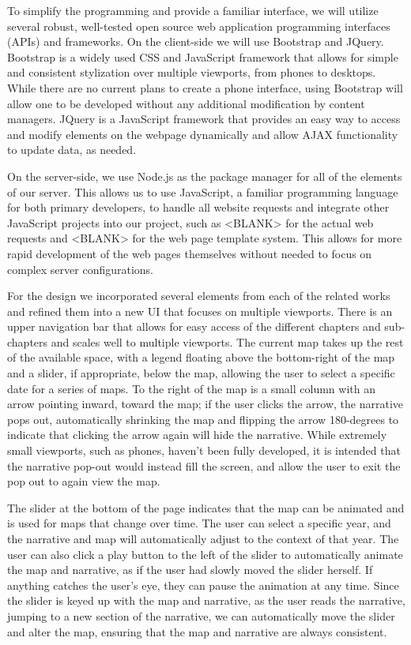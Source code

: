 \documentclass[11pt, draftcls, conference, onecolumn]{IEEEtran}
\begin{document}
To simplify the programming and provide a familiar interface, we will utilize several robust, well-tested open source web application programming interfaces (APIs) and frameworks. On the client-side we will use Bootstrap and JQuery. Bootstrap is a widely used CSS and JavaScript framework that allows for simple and consistent stylization over multiple viewports, from phones to desktops. While there are no current plans to create a phone interface, using Bootstrap will allow one to be developed without any additional modification by content managers. JQuery is a JavaScript framework that provides an easy way to access and modify elements on the webpage dynamically and allow AJAX functionality to update data, as needed.

On the server-side, we use Node.js as the package manager for all of the elements of our server. This allows us to use JavaScript, a familiar programming language for both primary developers, to handle all website requests and integrate other JavaScript projects into our project, such as <BLANK> for the actual web requests and <BLANK> for the web page template system. This allows for more rapid development of the web pages themselves without needed to focus on complex server configurations.

For the design we incorporated several elements from each of the related works and refined them into a new UI that focuses on multiple viewports. There is an upper navigation bar that allows for easy access of the different chapters and sub-chapters and scales well to multiple viewports. The current map takes up the rest of the available space, with a legend floating above the bottom-right of the map and a slider, if appropriate, below the map, allowing the user to select a specific date for a series of maps. To the right of the map is a small column with an arrow pointing inward, toward the map; if the user clicks the arrow, the narrative pops out, automatically shrinking the map and flipping the arrow 180-degrees to indicate that clicking the arrow again will hide the narrative. While extremely small viewports, such as phones, haven't been fully developed, it is intended that the narrative pop-out would instead fill the screen, and allow the user to exit the pop out to again view the map.

The slider at the bottom of the page indicates that the map can be animated and is used for maps that change over time. The user can select a specific year, and the narrative and map will automatically adjust to the context of that year. The user can also click a play button to the left of the slider to automatically animate the map and narrative, as if the user had slowly moved the slider herself. If anything catches the user's eye, they can pause the animation at any time. Since the slider is keyed up with the map and narrative, as the user reads the narrative, jumping to a new section of the narrative, we can automatically move the slider and alter the map, ensuring that the map and narrative are always consistent.
\end{document}
